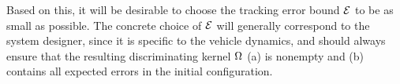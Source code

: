 Based on this, it will be desirable to choose the tracking error bound $\mathcal{E}$ to be as small as possible. The concrete choice of $\mathcal{E}$ will generally correspond to the system designer, since it is specific to the vehicle dynamics, and should always ensure that the resulting discriminating kernel $\Omega$ (a) is nonempty and (b) contains all expected errors in the initial configuration.
